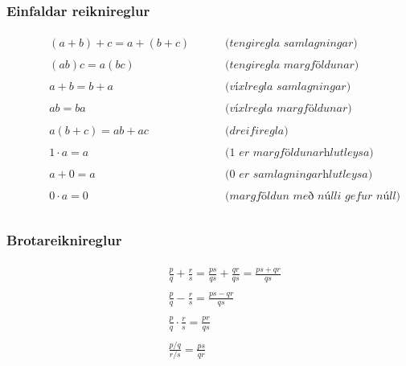 \documentclass[a4paper,10pt,icelandic]{sphinxmanual}
\begin{document}
\subsubsection{Einfaldar reiknireglur}
\label{\detokenize{Kafli12:einfaldar-reiknireglur}}\begin{equation*}
\begin{split}\begin{aligned}
    &(a+b)+c=a+(b+c)   \qquad &\textit{ (tengiregla samlagningar)}\\
\qquad \\
    &(ab)c=a(bc)  \qquad &\textit{ (tengiregla margföldunar)}\\
\qquad \\
    &a+b=b+a  \qquad &\textit{ (víxlregla samlagningar)} \\
\qquad \\
    &ab=ba  \qquad &\textit{ (víxlregla margföldunar)}\\
\qquad \\
    &a(b+c)=ab+ac  \qquad &\textit{ (dreifiregla)}\\
\qquad \\
    &1 \cdot a=a  \qquad &\textit{ (1 er margföldunarhlutleysa)}\\
\qquad \\
    &a+0=a  \qquad &\textit{ (0 er samlagningarhlutleysa)}\\
\qquad \\
    &0 \cdot a=0   \qquad &\textit{ (margföldun með núlli gefur núll)}\\
    \end{aligned}\end{split}
\end{equation*}

\subsubsection{Brotareiknireglur}
\label{\detokenize{Kafli12:brotareiknireglur}}\begin{equation*}
\begin{split}\begin{aligned}
& \frac{p}{q}+\frac{r}{s}=\frac{ps}{qs}+\frac{qr}{qs}=\frac{ps+qr}{qs} \\
\qquad \\
&\frac{p}{q}-\frac{r}{s}=\frac{ps-qr}{qs} \\
\qquad \\
& \frac{p}{q} \cdot \frac{r}{s}=\frac{pr}{qs} \\
\qquad \\
&\frac{p/q}{r/s} =\frac{ps}{qr} \\
\end{aligned}\end{split}
\end{equation*}
\end{document}
